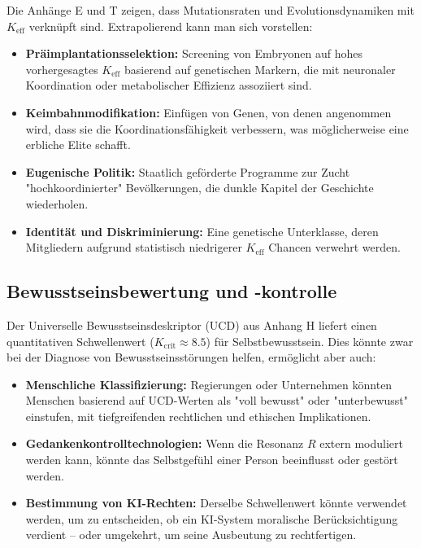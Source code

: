 \documentclass[12pt,a4paper]{article}
\theoremstyle{remark}
\newcommand{\Keff}{K_{\mathrm{eff}}}
\newcommand{\Kcrit}{K_{\mathrm{crit}}}
\begin{document}
	Die Anhänge E und T zeigen, dass Mutationsraten und Evolutionsdynamiken mit \(\Keff\) verknüpft sind. Extrapolierend kann man sich vorstellen:
	\begin{itemize}[leftmargin=*]
		\item \textbf{Präimplantationsselektion:} Screening von Embryonen auf hohes vorhergesagtes \(\Keff\) basierend auf genetischen Markern, die mit neuronaler Koordination oder metabolischer Effizienz assoziiert sind.
		\item \textbf{Keimbahnmodifikation:} Einfügen von Genen, von denen angenommen wird, dass sie die Koordinationsfähigkeit verbessern, was möglicherweise eine erbliche Elite schafft.
		\item \textbf{Eugenische Politik:} Staatlich geförderte Programme zur Zucht "hochkoordinierter" Bevölkerungen, die dunkle Kapitel der Geschichte wiederholen.
		\item \textbf{Identität und Diskriminierung:} Eine genetische Unterklasse, deren Mitgliedern aufgrund statistisch niedrigerer \(\Keff\) Chancen verwehrt werden.
	\end{itemize}
	
	\subsection{Bewusstseinsbewertung und -kontrolle}
	\label{subsec:consciousness}
	
	Der Universelle Bewusstseinsdeskriptor (UCD) aus Anhang H liefert einen quantitativen Schwellenwert (\(\Kcrit \approx 8.5\)) für Selbstbewusstsein. Dies könnte zwar bei der Diagnose von Bewusstseinsstörungen helfen, ermöglicht aber auch:
	\begin{itemize}[leftmargin=*]
		\item \textbf{Menschliche Klassifizierung:} Regierungen oder Unternehmen könnten Menschen basierend auf UCD-Werten als "voll bewusst" oder "unterbewusst" einstufen, mit tiefgreifenden rechtlichen und ethischen Implikationen.
		\item \textbf{Gedankenkontrolltechnologien:} Wenn die Resonanz \(R\) extern moduliert werden kann, könnte das Selbstgefühl einer Person beeinflusst oder gestört werden.
		\item \textbf{Bestimmung von KI-Rechten:} Derselbe Schwellenwert könnte verwendet werden, um zu entscheiden, ob ein KI-System moralische Berücksichtigung verdient – oder umgekehrt, um seine Ausbeutung zu rechtfertigen.
	\end{itemize}
	
\end{document}

